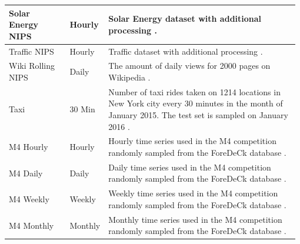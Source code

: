 \begin{table}[h]
\begin{tabular}{p{0.21\linewidth} | p{0.11\linewidth} | p{0.66\linewidth}}
    \hline
    Solar Energy NIPS  & Hourly    & Solar Energy dataset with additional processing \cite{salinas_high-dimensional_2019}.                                                                                                                                                                              \\
    \hline
    Traffic NIPS       & Hourly    & Traffic dataset with additional processing \cite{salinas_high-dimensional_2019}.                                                                                                                                                                                   \\
    \hline
    Wiki Rolling NIPS  & Daily     & The amount of daily views for 2000 pages on Wikipedia \cite{salinas_high-dimensional_2019}.                                                                                                                                                                        \\
    \hline
    Taxi               & 30 Min    & Number of taxi rides taken on 1214 locations in New York city every 30 minutes in the month of January 2015. The test set is sampled on January 2016 \cite{salinas_high-dimensional_2019}.                                                                         \\
    \hline
    M4 Hourly          & Hourly    & Hourly time series used in the M4 competition randomly sampled from the ForeDeCk database \cite{makridakis_m4_2020}.                                                                                                                                               \\
    \hline
    M4 Daily           & Daily     & Daily time series used in the M4 competition randomly sampled from the ForeDeCk database \cite{makridakis_m4_2020}.                                                                                                                                                \\
    \hline
    M4 Weekly          & Weekly    & Weekly time series used in the M4 competition randomly sampled from the ForeDeCk database \cite{makridakis_m4_2020}.                                                                                                                                               \\
    \hline
    M4 Monthly         & Monthly   & Monthly time series used in the M4 competition randomly sampled from the ForeDeCk database \cite{makridakis_m4_2020}.                                                                                                                                              \\

\end{tabular}
\end{table}
